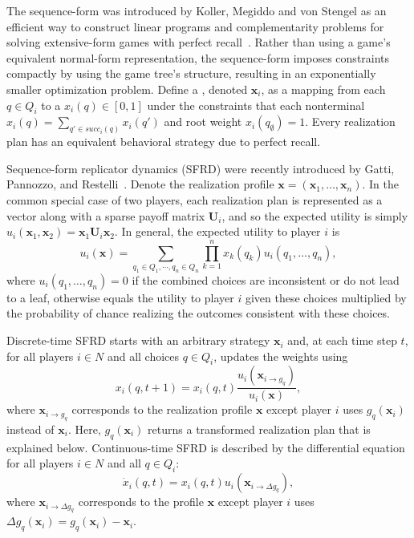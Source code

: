 \documentclass{aamas2014}
\newcommand{\bx}{\mathbf{x}}
\newcommand{\bU}{\mathbf{U}}
\newcommand{\defword}[1]{\textbf{\boldmath{#1}}}
\begin{document}
The sequence-form was introduced by Koller, Megiddo and von Stengel as an efficient way to construct
linear programs and complementarity problems for solving extensive-form games with perfect recall~\cite{SequenceFormLPs}. Rather than using a
game's equivalent normal-form representation, the sequence-form imposes constraints compactly by using the game tree's structure, 
resulting in an exponentially smaller optimization problem.
Define a \defword{realization plan}, denoted $\bx_i$, as a mapping from each $q \in Q_i$ to a \defword{realization weight} 
$x_i(q) \in [0,1]$ under the constraints that each nonterminal $x_i(q) = \sum_{q' \in succ_i(q)} x_i(q')$ and root weight $x_i(q_{\emptyset}) = 1$. 
Every realization plan has an equivalent behavioral strategy due to perfect recall. 

Sequence-form replicator dynamics (SFRD) were recently introduced by Gatti, Pannozzo, and Restelli~\cite{Gatti13Efficient}. 
Denote the realization profile $\bx = (\bx_1, \ldots, \bx_n)$. 
In the common special case of two players, each realization plan is represented as a vector along with a sparse payoff matrix $\bU_i$, 
and so the expected utility is simply $u_i(\bx_1, \bx_2) = \bx_1 \bU_i \bx_2$. 
In general, the expected utility to player $i$ is  
\begin{equation}
\label{eq:util}
u_i(\bx) = \sum_{q_1 \in Q_1, \cdots, q_n \in Q_n} \prod_{k=1}^n x_k(q_k) u_i(q_1, \ldots, q_n),
\end{equation}
where $u_i(q_1, \ldots, q_n) = 0$ if the combined choices are inconsistent or do not lead to a leaf, otherwise 
equals the utility to player $i$ given these choices multiplied by the probability of chance realizing the outcomes 
consistent with these choices. 

Discrete-time SFRD starts with an arbitrary strategy $\bx_i$ and, at each time step $t$, for all players $i \in N$ and all 
choices $q \in Q_i$, updates the weights using
\begin{equation}
\label{eq:dt-sfrd}
x_i(q,t+1) = x_i(q,t) \frac{u_i(\bx_{i \rightarrow g_{q}})}{u_i(\bx)},
\end{equation}
where $\bx_{i \rightarrow g_q}$ corresponds to the realization profile $\bx$ except player $i$ uses $g_q(\bx_i)$ instead of $\bx_i$. 
Here, $g_q(\bx_i)$ returns a transformed realization plan that is explained below. 
Continuous-time SFRD is described by the differential equation for all players $i \in N$ and all $q \in Q_i$:
\begin{equation}
\label{eq:ct-sfrd}
\dot{x}_i(q,t) = x_i(q,t) u_i(\bx_{i \rightarrow \Delta g_{q}}),
\end{equation}
where $\bx_{i \rightarrow \Delta g_q}$ corresponds to the profile $\bx$ except player $i$ uses $\Delta g_q(\bx_i) = g_q(\bx_i) - \bx_i$. 
\end{document}
